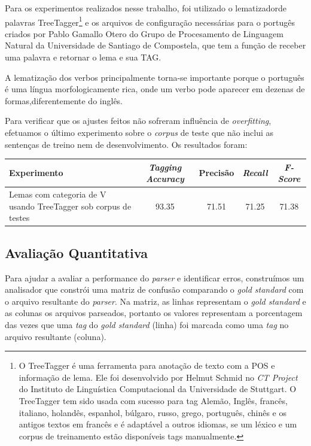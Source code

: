 Para os experimentos realizados nesse trabalho, foi utilizado o lematizadorde palavras TreeTagger\footnote{O TreeTagger é uma ferramenta para anotação de texto com a POS e informação de lema. Ele foi desenvolvido por Helmut Schmid no \emph{CT Project} do Instituto de Linguística Computacional da Universidade de Stuttgart. O TreeTagger tem sido usada com sucesso para tag Alemão, Inglês, francês, italiano, holandês, espanhol, búlgaro, russo, grego, português, chinês e os antigos textos em francês e é adaptável a outros idiomas, se um léxico e um corpus de treinamento estão disponíveis tags manualmente.} e os arquivos de configuração necessárias para o portugês criados por Pablo Gamallo Otero do Grupo de Procesamento de Linguagem Natural da Universidade de Santiago de Compostela, que tem a função de receber uma palavra e retornar o lema e sua TAG.

A lematização dos verbos principalmente torna-se importante porque o português é uma língua morfologicamente rica, onde um verbo pode aparecer em dezenas de formas,diferentemente do inglês.

Para verificar que os ajustes feitos não sofreram influência de \emph{overfitting}, efetuamos o último experimento sobre o \emph{corpus} de teste que não inclui as sentenças de treino nem de desenvolvimento. Os resultados foram:

\begin{center}
   \footnotesize
	\begin{tabular}{|p{7cm}|c|c|c|c|}
		\hline
		\textbf{Experimento} &  \textbf{\emph{Tagging Accuracy}} & \textbf{Precisão} & \textbf{\emph{Recall}} & \textbf{\emph{F-Score}} \\
		\hline
		Lemas com categoria de V usando TreeTagger sob corpus de testes & 93.35 & 71.51 & 71.25 & 71.38\\
		\hline		
	\end{tabular}
	\label{tab:experimento_corpus_teste}
\end{center}

\subsection{Avaliação Quantitativa}

Para ajudar a avaliar a performance do \emph{parser} e identificar erros, construímos um analisador que constrói uma matriz de confusão comparando o \emph{gold standard} com o arquivo resultante do \emph{parser}. Na matriz, as linhas representam o \emph{gold standard} e as colunas os arquivos parseados, portanto os valores representam a porcentagem das vezes que uma \emph{tag} do \emph{gold standard} (linha) foi marcada como uma \emph{tag} no arquivo resultante (coluna).

